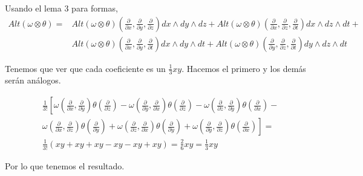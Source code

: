 \documentclass[twoside]{article}
\newcommand{\parcial}[2]{\frac{\partial #1}{\partial #2}}
\begin{document}
\begin{solucion}
\begin{enumerate}
\begin{comment}
{\bf 2ª MANERA}
\end{comment}
Usando el lema 3 para formas,
\begin{align*}
Alt(ω ⊗ θ) =& Alt(ω ⊗ θ)\left(\parcial{}{x},\parcial{}{y},\parcial{}{z}\right)dx\wedge dy\wedge dz +Alt(ω ⊗ θ)\left(\parcial{}{x},\parcial{}{z},\parcial{}{t}\right)dx\wedge dz\wedge dt+\\
& Alt(ω ⊗ θ)\left(\parcial{}{x},\parcial{}{y},\parcial{}{t}\right)dx\wedge dy\wedge dt+ Alt(ω ⊗ θ)\left(\parcial{}{y},\parcial{}{z},\parcial{}{t}\right)dy\wedge dz\wedge dt
\end{align*}

Tenemos que ver que cada coeficiente es un $\frac{1}{3}xy$. Hacemos el primero y los demás serán análogos.

\begin{align*}
&\frac{1}{3!}\left[ ω\left(\parcial{}{x},\parcial{}{y}\right)θ\left(\parcial{}{z}\right)-ω\left(\parcial{}{y},\parcial{}{x}\right)θ\left(\parcial{}{z}\right)-ω\left(\parcial{}{z},\parcial{}{y}\right)θ\left(\parcial{}{x}\right)-\right.\\
&\left.ω\left(\parcial{}{x},\parcial{}{z}\right)θ\left(\parcial{}{y}\right)+ω\left(\parcial{}{z},\parcial{}{x}\right)θ\left(\parcial{}{y}\right)+ω\left(\parcial{}{y},\parcial{}{z}\right)θ\left(\parcial{}{x}\right)\right]=\\
&\frac{1}{3!}(xy+xy+xy-xy-xy+xy)=\frac{2}{6}xy=\boxed{\frac{1}{3}xy}
\end{align*}

Por lo que tenemos el resultado.


\end{enumerate}






\end{solucion}
\end{document}
